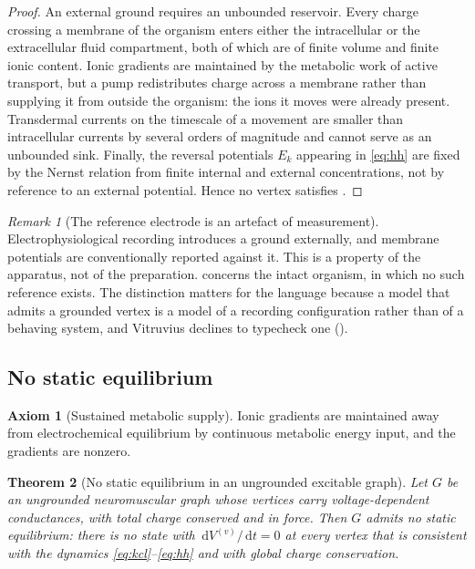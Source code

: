\documentclass[11pt,twocolumn,a4paper]{article}
\theoremstyle{thmstyle}
\newtheorem{theorem}{Theorem}[section]
\theoremstyle{definition}
\newtheorem{axiom}{Axiom}
\theoremstyle{remark}
\newtheorem{remark}[theorem]{Remark}
\newcommand{\Gph}{G}
\newcommand{\dd}{\,\mathrm{d}}
\begin{document}
\begin{proof}
An external ground requires an unbounded reservoir. Every charge crossing a
membrane of the organism enters either the intracellular or the extracellular
fluid compartment, both of which are of finite volume and finite ionic
content. Ionic gradients are maintained by the metabolic work of active
transport, but a pump redistributes charge across a membrane rather than
supplying it from outside the organism: the ions it moves were already
present. Transdermal currents on the timescale of a movement are smaller than
intracellular currents by several orders of magnitude and cannot serve as an
unbounded sink. Finally, the reversal potentials $E_k$ appearing in
\eqref{eq:hh} are fixed by the Nernst relation from finite internal and
external concentrations, not by reference to an external potential. Hence no
vertex satisfies .
\end{proof}

\begin{remark}[The reference electrode is an artefact of measurement]
\label{rem:electrode}
Electrophysiological recording introduces a ground externally, and membrane
potentials are conventionally reported against it. This is a property of the
apparatus, not of the preparation.  concerns the intact
organism, in which no such reference exists. The distinction matters for the
language because a model that admits a grounded vertex is a model of a
recording configuration rather than of a behaving system, and Vitruvius
declines to typecheck one ().
\end{remark}

\subsection{No static equilibrium}

\begin{axiom}[Sustained metabolic supply]
\label{ax:metabolic}
Ionic gradients are maintained away from electrochemical equilibrium by
continuous metabolic energy input, and the gradients are nonzero.
\end{axiom}

\begin{theorem}[No static equilibrium in an ungrounded excitable graph]
\label{thm:no-equilibrium}
Let $\Gph$ be an ungrounded neuromuscular graph whose vertices carry
voltage-dependent conductances, with total charge conserved and
 in force. Then $\Gph$ admits no static equilibrium: there
is no state with $\dd V^{(v)}/\dd t=0$ at every vertex that is consistent with
the dynamics \eqref{eq:kcl}--\eqref{eq:hh} and with global charge
conservation.
\end{theorem}
\end{document}
